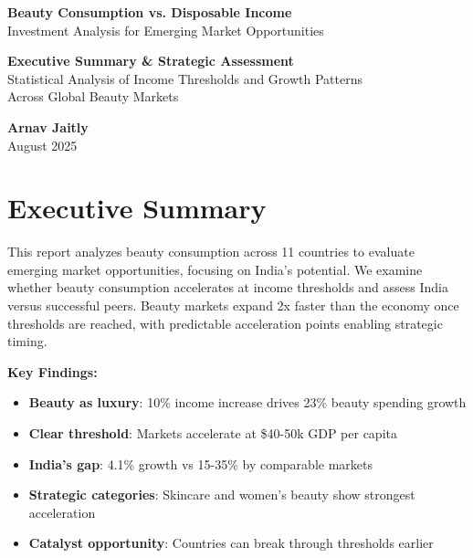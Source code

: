 \documentclass[11pt]{article}
\begin{document}
\begin{titlepage}
\centering
\vspace*{2cm}

{\Huge\bfseries Beauty Consumption vs. Disposable Income}\\[0.5cm]
{\Large Investment Analysis for Emerging Market Opportunities}\\[1.5cm]

\vspace{2cm}

{\large
\textbf{Executive Summary \& Strategic Assessment}\\[0.3cm]
Statistical Analysis of Income Thresholds and Growth Patterns\\[0.3cm]
Across Global Beauty Markets
}

\vspace{3cm}

{\Large
\textbf{Arnav Jaitly}\\[0.5cm]
August 2025
}

\vfill

\end{titlepage}

\newpage

\section*{Executive Summary}

This report analyzes beauty consumption across 11 countries to evaluate emerging market opportunities, focusing on India's potential. We examine whether beauty consumption accelerates at income thresholds and assess India versus successful peers. Beauty markets expand 2x faster than the economy once thresholds are reached, with predictable acceleration points enabling strategic timing.

\textbf{Key Findings:}
\vspace{-3pt}
\begin{itemize}
    \setlength{\itemsep}{1pt}
    \item \textbf{Beauty as luxury}: 10\% income increase drives 23\% beauty spending growth
    \item \textbf{Clear threshold}: Markets accelerate at \$40-50k GDP per capita
    \item \textbf{India's gap}: 4.1\% growth vs 15-35\% by comparable markets
    \item \textbf{Strategic categories}: Skincare and women's beauty show strongest acceleration
    \item \textbf{Catalyst opportunity}: Countries can break through thresholds earlier
\end{itemize}
\end{document}
